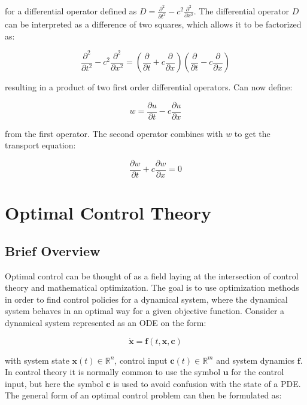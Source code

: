 \noindent for a differential operator defined as $D = \frac{\partial^2}{\partial t^2} - c^2 \frac{\partial^2}{\partial x^2}$. The differential operator $D$ can be interpreted as a difference of two squares, which allows it to be factorized as:

\begin{equation}
    \frac{\partial^2}{\partial t^2} - c^2 \frac{\partial^2}{\partial x^2} = (\frac{\partial}{\partial t} + c \frac{\partial}{\partial x}) (\frac{\partial}{\partial t} - c \frac{\partial}{\partial x})
\end{equation}

\noindent resulting in a product of two first order differential operators. Can now define:

\begin{equation}
    w = \frac{\partial u}{\partial t} - c \frac{\partial u}{\partial x}
\end{equation}

\noindent from the first operator. The second operator combines with $w$ to get the transport equation:

\begin{equation}
    \frac{\partial w}{\partial t} + c \frac{\partial w}{\partial x} = 0
\end{equation}
\fi





\section{Optimal Control Theory}

\subsection{Brief Overview}

Optimal control can be thought of as a field laying at the intersection of control theory and mathematical optimization. The goal is to use optimization methods in order to find control policies for a dynamical system, where the dynamical system behaves in an optimal way for a given objective function. Consider a dynamical system represented as an ODE on the form:

\begin{equation}
    \dot{\bm{x}} = \bm{f}(t, \bm{x}, \bm{c})
    \label{eq:odesystem}
\end{equation}

\noindent with system state $\bm{x}(t) \in \mathbb{R}^n$, control input $\bm{c}(t) \in \mathbb{R}^m$ and system dynamics $\bm{f}$. In control theory it is normally common to use the symbol $\bm{u}$ for the control input, but here the symbol $\bm{c}$ is used to avoid confusion with the state of a PDE. The general form of an optimal control problem can then be formulated as:

